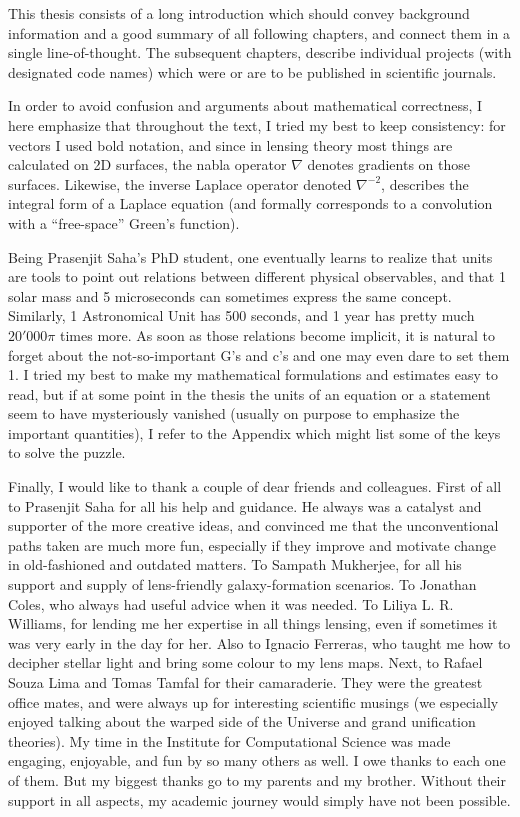 \small
This thesis consists of a long introduction which should convey background
information and a good summary of all following chapters, and connect them in a
single line-of-thought.  The subsequent chapters, describe individual projects
(with designated code names) which were or are to be published in scientific
journals.

In order to avoid confusion and arguments about mathematical correctness, I here
emphasize that throughout the text, I tried my best to keep consistency: for
vectors I used bold notation, and since in lensing theory most things are
calculated on 2D surfaces, the nabla operator $\nabla$ denotes gradients on
those surfaces.  Likewise, the inverse Laplace operator denoted $\nabla^{-2}$,
describes the integral form of a Laplace equation (and formally corresponds to a
convolution with a ``free-space'' Green's function).

Being Prasenjit Saha's PhD student, one eventually learns to realize that
units are tools to point out relations between different physical observables,
and that 1 solar mass and 5 microseconds can sometimes express the same concept.
Similarly, 1 Astronomical Unit has 500 seconds, and 1 year has pretty much
$20'000\pi$ times more.  As soon as those relations become implicit, it is
natural to forget about the not-so-important G's and c's and one may even dare
to set them 1.  I tried my best to make my mathematical formulations and
estimates easy to read, but if at some point in the thesis the units of an
equation or a statement seem to have mysteriously vanished (usually on purpose
to emphasize the important quantities), I refer to the Appendix which might list
some of the keys to solve the puzzle.

Finally, I would like to thank a couple of dear friends and colleagues.  First
of all to Prasenjit Saha for all his help and guidance.  He always was a
catalyst and supporter of the more creative ideas, and convinced me that the
unconventional paths taken are much more fun, especially if they improve and
motivate change in old-fashioned and outdated matters.  To Sampath Mukherjee,
for all his support and supply of lens-friendly galaxy-formation scenarios.  To
Jonathan Coles, who always had useful advice when it was needed.  To Liliya L.
R. Williams, for lending me her expertise in all things lensing, even if
sometimes it was very early in the day for her.  Also to Ignacio Ferreras, who
taught me how to decipher stellar light and bring some colour to my lens maps.
Next, to Rafael Souza Lima and Tomas Tamfal for their camaraderie.  They were
the greatest office mates, and were always up for interesting scientific
musings  (we especially enjoyed talking about the warped side of the Universe
and grand unification theories).  My time in the Institute for Computational
Science was made engaging, enjoyable, and fun by so many others as well. I owe
thanks to each one of them.  But my biggest thanks go to my parents and my
brother.  Without their support in all aspects, my academic journey would simply
have not been possible.
\normalsize
